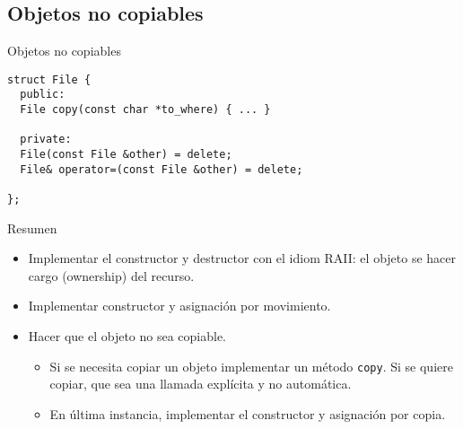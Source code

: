 \subsection*{Objetos no copiables}
\begin{frame}[fragile]{ Objetos no copiables}{}
        \begin{lstlisting}[style=normal,firstnumber=1]
struct File {
  public:
  File copy(const char *to_where) { ... }

  private:
  File(const File &other) = delete;
  File& operator=(const File &other) = delete;

};
        \end{lstlisting}
\end{frame}

\begin{frame}[fragile]{Resumen}
   \begin{itemize}
       \item Implementar el constructor y destructor con el idiom RAII: el objeto se hacer cargo (ownership) del recurso.
       \item Implementar constructor y asignaci\'on por movimiento.
       \item Hacer que el objeto no sea copiable.
       \begin{itemize}
            \item Si se necesita copiar un objeto implementar un m\'etodo \lstinline[style=normal]!copy!. Si se quiere copiar, que sea una llamada expl\'icita y no autom\'atica.
            \item En \'ultima instancia, implementar el constructor y asignaci\'on por copia.
       \end{itemize}
   \end{itemize}
\end{frame}

